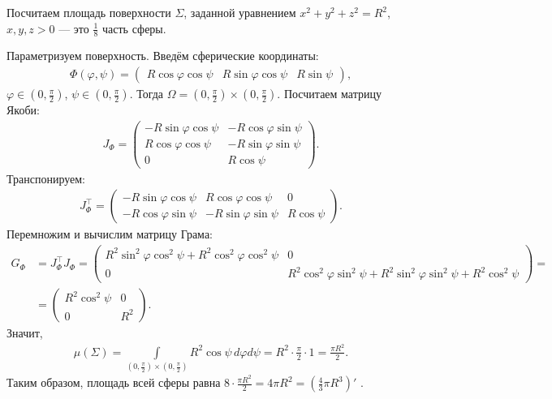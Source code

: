 \begin{exmpl}
 Посчитаем площадь поверхности $\Sigma$, заданной уравнением $x^{2} + y^{2} + z^{2} = R^{2}$, $x, y, z > 0$ --- это $\frac{1}{8}$ часть сферы.

 Параметризуем поверхность. Введём сферические координаты:
 \begin{align*}
  \Phi(\varphi, \psi) = \begin{pmatrix}
   R \cos \varphi \cos \psi & R \sin\varphi \cos \psi & R \sin \psi
  \end{pmatrix}
 ,\end{align*}  $\varphi \in (0, \frac{\pi}{2})$, $\psi \in (0, \frac{\pi}{2})$. Тогда $\Omega = (0, \frac{\pi}{2}) \times (0, \frac{\pi}{2})$. Посчитаем матрицу Якоби:
 \begin{align*}
  J_{\Phi} = \begin{pmatrix}
   -R \sin \varphi \cos \psi & -R  \cos \varphi \sin \psi \\
   R \cos \varphi \cos \psi & -R \sin \varphi \sin \psi \\
   0 & R \cos \psi
  \end{pmatrix}
 .\end{align*} Транспонируем:
 \begin{align*}
  J_{\Phi}^{\top} = \begin{pmatrix}
   -R \sin \varphi \cos \psi & R \cos \varphi \cos \psi & 0 \\
   -R  \cos \varphi \sin \psi & -R \sin \varphi \sin \psi & R \cos \psi 
  \end{pmatrix}
 .\end{align*} Перемножим и вычислим матрицу Грама:
 \begin{align*}
  G_{\Phi} &= J_{\Phi}^{\top} J_{\Phi} = \begin{pmatrix}
   R^{2} \sin^{2} \varphi \cos^{2} \psi + R^{2} \cos^{2} \varphi \cos^{2} \psi & 0 \\
   0 & R^{2}\cos^{2}\varphi \sin^{2}\psi + R^{2} \sin^2 \varphi \sin^{2} \psi + R^{2} \cos^{2} \psi
  \end{pmatrix} = \\
  &= \begin{pmatrix}
   R^{2} \cos^{2} \psi & 0 \\
   0 & R^{2}
  \end{pmatrix}
 .\end{align*} Значит, 
 \begin{align*}
  \mu(\Sigma) = \int\limits_{(0, \frac{\pi}{2}) \times (0, \frac{\pi}{2})} R^{2} \cos\psi  \, d\varphi d\psi = R^{2} \cdot \frac{\pi}{2} \cdot 1 = \frac{\pi R^{2}}{2}
 .\end{align*} Таким образом, площадь всей сферы равна $8 \cdot \frac{\pi R^{2}}{2} = 4 \pi R^{2} = \left( \frac{4}{3} \pi R^{3} \right)'$ .
\end{exmpl}
